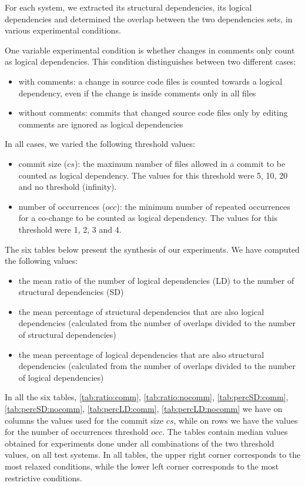 \documentclass[a4paper,twoside]{article}
\begin{document}
For each system, we extracted its structural dependencies, its logical dependencies and determined the overlap between the two dependencies sets, in various experimental conditions. 

One variable experimental condition is whether changes in comments only count as logical dependencies. This condition distinguishes between two different cases: 
\begin{itemize}
	\item with comments: a change in source code files is counted towards a logical dependency, even if the change is inside comments only in all files
	\item without comments: commits that changed source code files only by editing comments are ignored as logical dependencies
\end{itemize}

In all cases, we varied the following threshold values: 
 \begin{itemize}
	\item commit size ($cs$): the maximum number of files allowed in a commit to be counted as logical dependency. The values for this threshold were 5, 10, 20 and no threshold (infinity).  
	\item number of occurrences ($occ$): the minimum number of repeated occurrences for a co-change to be counted as logical dependency. The values for this threshold were 1, 2, 3 and 4.  
\end{itemize}

The six tables below present the synthesis of our experiments. 
We have computed the following  values:
\begin{itemize}
	\item the mean ratio of the number of logical dependencies  (LD) to the number of structural dependencies (SD)
   \item the mean percentage of structural dependencies that are also logical dependencies (calculated from the number of overlaps divided to the number of structural dependencies)	
		\item the mean percentage of logical dependencies that are also structural dependencies (calculated from the number of overlaps divided to the number of logical dependencies)
\end{itemize}

In all the six tables, \ref{tab:ratio:comm}, \ref{tab:ratio:nocomm}, \ref{tab:percSD:comm}, \ref{tab:percSD:nocomm},
\ref{tab:percLD:comm}, \ref{tab:percLD:nocomm} we have on columns the values used for the commit size $cs$, while on rows we have the values for the number of occurrences threshold $occ$. The tables contain median values obtained for experiments done under all combinations of the two threshold values, on all test systems. In all tables, the upper right corner corresponds to the most relaxed conditions, while the lower left corner corresponds to the most restrictive conditions.
\end{document}
